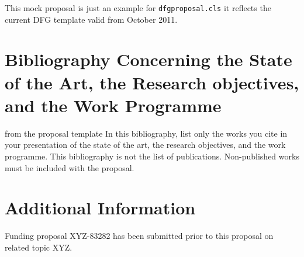 \documentclass[    %
    gitinfo,       %
    RAM,           %
    general,       %
    \classoptions] %
    {dfgproposal}
\begin{document}
\begin{center}\color{red}\huge
  This mock proposal is just an example for \texttt{dfgproposal.cls} it reflects the 
  current DFG template valid from October 2011.
\end{center}

\begin{proposal}[
  PI=miko,
  mikoname=Michael Kohlhase,
  mikoaffiliation=FAU Erlangen N\"urnberg,
  mikodept=Computer Science,
  mikotitle=Prof. Dr.,
  PI=gc,
  gcname=Great Communicator,
  gcaffiliation=Power Consulting GmbH,
  gcdept=Science Affairs,
  gctitle=Dr.,
  site=fau,
  fauacronym=FAU,
  faushortname=FAU Erlangen N\"urnberg,
  site=pcg,
  pcgacronym=PCG,
  pcgshortname=Power Consulting GmbH,
  thema=Intelligentes Schreiben von Antr\"agen,
  acronym={iPoWr},
  acrolong={\underline{I}ntelligent} {\underline{P}r\underline{o}posal} {\underline{Wr}iting},
  title=\pn: \protect\pnlong,
  totalduration=3 years,
  start=1. Feb. 2010,
  months=24,
  discipline=Computer Science, 
  areas=Knowledge Management,
  keywords={LaTeX Active Documents}
  ]






\section{Bibliography Concerning the State of the Art, the Research objectives, and the
  Work Programme}\label{sec:bib}

\begin{todo}{from the proposal template}
In this bibliography, list only the works you cite in your presentation of the state of the
art, the research objectives, and the work programme. This bibliography is not the list
of publications. Non-published works must be included with the proposal.
\end{todo}
\printbibliography[heading=empty,notcategory=featured]
\ifpublic\else



\section{Additional Information}\label{sec:additional}

Funding proposal XYZ-83282 has been submitted prior to this proposal on related topic XYZ.
\fi %
\end{proposal}
\end{document}
